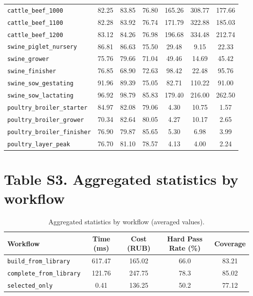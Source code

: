 \documentclass[11pt]{article}
\begin{document}
\begin{longtable}{lcccccc}
\texttt{cattle\_beef\_1000} & 82.25 & 83.85 & 76.80 & 165.26 & 308.77 & 177.66 \\
\texttt{cattle\_beef\_1100} & 82.28 & 83.92 & 76.74 & 171.79 & 322.88 & 185.03 \\
\texttt{cattle\_beef\_1200} & 83.12 & 84.26 & 76.98 & 196.68 & 334.48 & 212.74 \\
\texttt{swine\_piglet\_nursery} & 86.81 & 86.63 & 75.50 & 29.48 & 9.15 & 22.33 \\
\texttt{swine\_grower} & 75.76 & 79.66 & 71.04 & 49.46 & 14.69 & 45.42 \\
\texttt{swine\_finisher} & 76.85 & 68.90 & 72.63 & 98.42 & 22.48 & 95.76 \\
\texttt{swine\_sow\_gestating} & 91.96 & 89.39 & 75.05 & 82.71 & 110.22 & 91.00 \\
\texttt{swine\_sow\_lactating} & 96.92 & 98.79 & 85.83 & 179.40 & 216.00 & 262.50 \\
\texttt{poultry\_broiler\_starter} & 84.97 & 82.08 & 79.06 & 4.30 & 10.75 & 1.57 \\
\texttt{poultry\_broiler\_grower} & 70.34 & 82.64 & 80.05 & 4.27 & 10.17 & 2.65 \\
\texttt{poultry\_broiler\_finisher} & 76.90 & 79.87 & 85.65 & 5.30 & 6.98 & 3.99 \\
\texttt{poultry\_layer\_peak} & 76.70 & 81.10 & 78.57 & 4.13 & 4.00 & 2.24 \\
\end{longtable}

\section*{Table S3. Aggregated statistics by workflow}
\begin{table}[H]
\centering
\caption{Aggregated statistics by workflow (averaged values).}\label{tab:s3_wf}
\begin{tabular}{lcccc}
\toprule
\textbf{Workflow} & \textbf{Time (ms)} & \textbf{Cost (RUB)} & \textbf{Hard Pass Rate (\%)} & \textbf{Coverage} \\
\midrule
\texttt{build\_from\_library} & 617.47 & 165.02 & 66.0 & 83.21 \\
\texttt{complete\_from\_library} & 121.76 & 247.75 & 78.3 & 85.02 \\
\texttt{selected\_only} & 0.41 & 136.25 & 50.2 & 77.12 \\
\bottomrule
\end{tabular}
\end{table}
\end{document}
